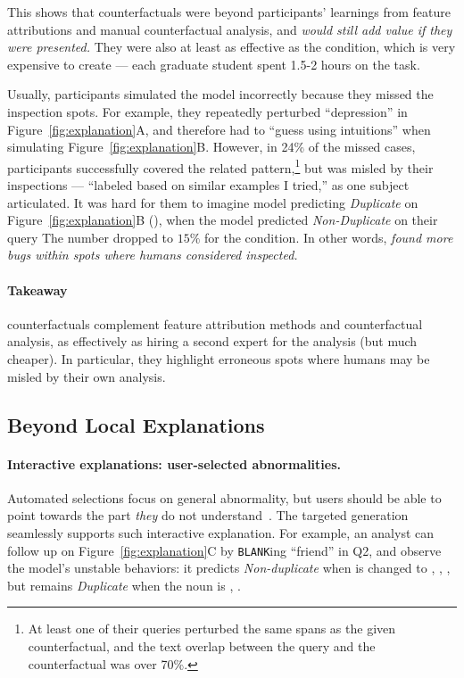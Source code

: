This shows that \cshap counterfactuals were beyond participants' learnings from feature attributions and manual counterfactual analysis, and \emph{would still add value if they were presented.}
They were also at least as effective as the \chuman condition, which is very expensive to create --- each graduate student spent 1.5-2 hours on the task.


Usually, participants simulated the model incorrectly because they missed the inspection spots.
For example, they repeatedly perturbed ``depression'' in Figure~\ref{fig:explanation}A, and therefore had to ``guess using intuitions'' when simulating Figure~\ref{fig:explanation}B.
However, in 24\% of the missed \cshap cases, participants successfully covered the related pattern,\footnote{At least one of their queries perturbed the same spans as the given counterfactual, and the text overlap between the query and the counterfactual was over 70\%.} but was misled by their inspections --- ``labeled based on similar examples I tried,'' as one subject articulated.
It was hard for them to imagine model predicting \emph{Duplicate} on Figure~\ref{fig:explanation}B (), when the model predicted \emph{Non-Duplicate} on their query 
The number dropped to $15\%$ for the \chuman condition.
In other words, \emph{\cshap found more bugs within spots where humans considered inspected.}

\paragraph{Takeaway}
\sysname counterfactuals complement feature attribution methods and counterfactual analysis, as effectively as hiring a second expert for the analysis (but much cheaper).
In particular, they highlight erroneous spots where humans may be misled by their own analysis.

\subsection{Beyond Local Explanations}
\label{subsec:exp_more}

\paragraph{Interactive explanations: user-selected abnormalities.}
Automated selections focus on general abnormality, but users should be able to point towards the part \emph{they} do not understand~\cite{miller}.
The targeted generation seamlessly supports such interactive explanation.
For example, an analyst can follow up on Figure~\ref{fig:explanation}C by \texttt{BLANK}ing ``friend'' in Q2, and observe the model's unstable behaviors: it predicts \emph{Non-duplicate} when  is changed to , , , but remains \emph{Duplicate} when the noun is , .


